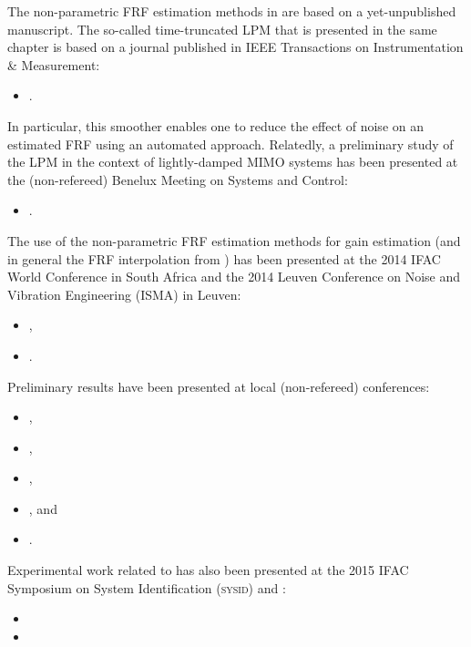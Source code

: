\begin{refsection}
The non-parametric \gls{FRF} estimation methods in  are based on a yet-unpublished manuscript.
The so-called time-truncated \gls{LPM} that is presented in the same chapter is based on a journal published in \gls{IEEE} Transactions on Instrumentation \& Measurement:
\begin{itemize}
  \item {}.
\end{itemize}
In particular, this smoother enables one to reduce the effect of noise on an estimated \gls{FRF} using an automated approach.
Relatedly, a preliminary study of the \gls{LPM} in the context of lightly-damped \gls{MIMO} systems has been presented at the (non-refereed) Benelux Meeting on Systems and Control:
\begin{itemize}
    \item {}.
\end{itemize}

The use of the non-parametric \gls{FRF} estimation methods for \Hinf gain estimation (and in general the \gls{FRF} interpolation from ) has been presented at the 2014 \gls{IFAC} World Conference in South Africa and the 2014 Leuven Conference on Noise and Vibration Engineering (ISMA) in Leuven:
\begin{itemize}
  \item {},
  \item {}.
\end{itemize}
Preliminary results have been presented at local (non-refereed) conferences:
\begin{itemize}
  \item {},
  \item {},
  \item {},
  \item {}, and
  \item {}.
\end{itemize}
Experimental work related to  has also been presented at the 2015 \gls{IFAC} Symposium on System Identification (\textsc{sysid}) and :
\begin{itemize}
  \item {}
  \item {}
\end{itemize}


\end{refsection}

